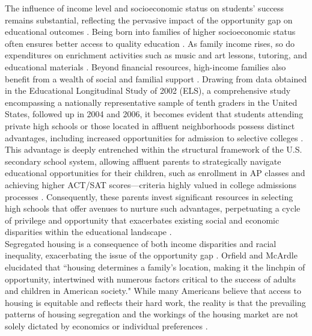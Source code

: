 \documentclass[sn-mathphys-num]{sn-jnl}%
\theoremstyle{thmstyleone}%
\theoremstyle{thmstyletwo}%
\theoremstyle{thmstylethree}%
\begin{document}
The influence of income level and socioeconomic status on students' success remains substantial, reflecting the pervasive impact of the opportunity gap on educational outcomes \cite{whither_opportunity, klugman2012resource, ladson2006achievement, carter2013closing}. Being born into families of higher socioeconomic status often ensures better access to quality education \cite{carter2013closing, whither_opportunity, orfield2006vicious}. As family income rises, so do expenditures on enrichment activities such as music and art lessons, tutoring, and educational materials \cite{whither_opportunity, carter2013closing}. Beyond financial resources, high-income families also benefit from a wealth of social and familial support \cite{whither_opportunity, klugman2012resource}. Drawing from data obtained in the Educational Longitudinal Study of 2002 (ELS), a comprehensive study encompassing a nationally representative sample of tenth graders in the United States, followed up in 2004 and 2006, it becomes evident that students attending private high schools or those located in affluent neighborhoods possess distinct advantages, including increased opportunities for admission to selective colleges \cite{klugman2012resource}. This advantage is deeply entrenched within the structural framework of the U.S. secondary school system, allowing affluent parents to strategically navigate educational opportunities for their children, such as enrollment in AP classes and achieving higher ACT/SAT scores—criteria highly valued in college admissions processes \cite{klugman2012resource, carter2013closing}. Consequently, these parents invest significant resources in selecting high schools that offer avenues to nurture such advantages, perpetuating a cycle of privilege and opportunity that exacerbates existing social and economic disparities within the educational landscape \cite{klugman2012resource, carter2013closing}.\\

Segregated housing is a consequence of both income disparities and racial inequality, exacerbating the issue of the opportunity gap \cite{carter2013closing, orfield2006vicious}. Orfield and McArdle  \cite{orfield2006vicious} elucidated that ``housing determines a family's location, making it the linchpin of opportunity, intertwined with numerous factors critical to the success of adults and children in American society." While many Americans believe that access to housing is equitable and reflects their hard work, the reality is that the prevailing patterns of housing segregation and the workings of the housing market are not solely dictated by economics or individual preferences \cite{orfield2006vicious, carter2013closing, pattillo2018black}.\\
\end{document}

